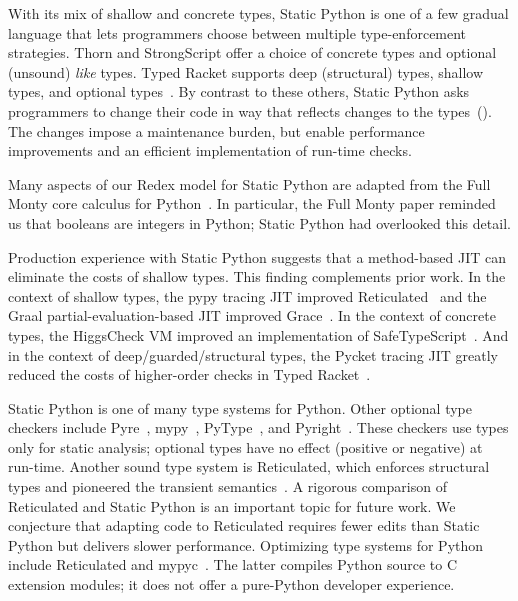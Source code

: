 \documentclass[english,cleveref,crc]{programming}
\newcommand{\SP}{Static Python}
\begin{document}
With its mix of shallow and concrete types, \SP{} is one of a few gradual
language that lets programmers choose between multiple type-enforcement strategies.
Thorn and StrongScript offer a choice of concrete types and optional (unsound)
\emph{like} types.
Typed Racket supports deep (structural) types, shallow types, and optional
types~\cite{g-pldi-2022}.
By contrast to these others, \SP{} asks programmers to change their code
in way that reflects changes to the types~().
The changes impose a maintenance burden, but enable performance improvements
and an efficient implementation of run-time checks.

Many aspects of our Redex model for \SP{} are adapted from the Full Monty core calculus
for Python~\cite{pmmwplck-oopsla-2013}.
In particular, the Full Monty paper reminded us that booleans are integers in Python;
\SP{} had overlooked this detail.

Production experience with \SP{} suggests that a method-based JIT can
eliminate the costs of shallow types.
This finding complements prior work.
In the context of shallow types,
the pypy tracing JIT improved Reticulated~\cite{vsc-dls-2019}
and the Graal partial-evaluation-based JIT improved Grace~\cite{rmhn-ecoop-2019,grmhn-vmil-2019}.
In the context of concrete types, the HiggsCheck VM improved an implementation of
SafeTypeScript~\cite{rsfbv-popl-2015,rat-oopsla-2017}.
And in the context of deep/guarded/structural types, the Pycket tracing JIT greatly reduced the costs of higher-order
checks in Typed Racket~\cite{bbst-oopsla-2017}.

\SP{} is one of many type systems for Python.
Other optional type checkers include Pyre~\cite{pyre},
mypy~\cite{mypy}, PyType~\cite{pytype}, and Pyright~\cite{pyright}.
These checkers use types only for static analysis; optional types have no
effect (positive or negative) at run-time.
Another sound type system is Reticulated, which enforces structural types and
pioneered the transient semantics~\cite{vss-popl-2017,v-thesis-2019}.
A rigorous comparison of Reticulated and \SP{} is an important topic for future work.
We conjecture that adapting code to Reticulated requires fewer edits than \SP{}
but delivers slower performance.
Optimizing type systems for Python include Reticulated and mypyc~\cite{mypyc}.
The latter compiles Python source to C extension modules;
it does not offer a pure-Python developer experience.
\end{document}
